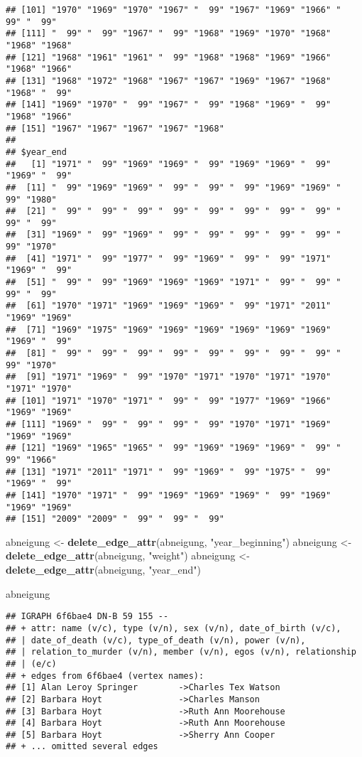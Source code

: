 \documentclass[
]{article}
\newenvironment{Shaded}{\begin{snugshade}}{\end{snugshade}}
\newcommand{\KeywordTok}[1]{\textcolor[rgb]{0.13,0.29,0.53}{\textbf{#1}}}
\newcommand{\NormalTok}[1]{#1}
\newcommand{\StringTok}[1]{\textcolor[rgb]{0.31,0.60,0.02}{#1}}
\begin{document}
\begin{verbatim}
## [101] "1970" "1969" "1970" "1967" "  99" "1967" "1969" "1966" "  99" "  99"
## [111] "  99" "  99" "1967" "  99" "1968" "1969" "1970" "1968" "1968" "1968"
## [121] "1968" "1961" "1961" "  99" "1968" "1968" "1969" "1966" "1968" "1966"
## [131] "1968" "1972" "1968" "1967" "1967" "1969" "1967" "1968" "1968" "  99"
## [141] "1969" "1970" "  99" "1967" "  99" "1968" "1969" "  99" "1968" "1966"
## [151] "1967" "1967" "1967" "1967" "1968"
## 
## $year_end
##   [1] "1971" "  99" "1969" "1969" "  99" "1969" "1969" "  99" "1969" "  99"
##  [11] "  99" "1969" "1969" "  99" "  99" "  99" "1969" "1969" "  99" "1980"
##  [21] "  99" "  99" "  99" "  99" "  99" "  99" "  99" "  99" "  99" "  99"
##  [31] "1969" "  99" "1969" "  99" "  99" "  99" "  99" "  99" "  99" "1970"
##  [41] "1971" "  99" "1977" "  99" "1969" "  99" "  99" "1971" "1969" "  99"
##  [51] "  99" "  99" "1969" "1969" "1969" "1971" "  99" "  99" "  99" "  99"
##  [61] "1970" "1971" "1969" "1969" "1969" "  99" "1971" "2011" "1969" "1969"
##  [71] "1969" "1975" "1969" "1969" "1969" "1969" "1969" "1969" "1969" "  99"
##  [81] "  99" "  99" "  99" "  99" "  99" "  99" "  99" "  99" "  99" "1970"
##  [91] "1971" "1969" "  99" "1970" "1971" "1970" "1971" "1970" "1971" "1970"
## [101] "1971" "1970" "1971" "  99" "  99" "1977" "1969" "1966" "1969" "1969"
## [111] "1969" "  99" "  99" "  99" "  99" "1970" "1971" "1969" "1969" "1969"
## [121] "1969" "1965" "1965" "  99" "1969" "1969" "1969" "  99" "  99" "1966"
## [131] "1971" "2011" "1971" "  99" "1969" "  99" "1975" "  99" "1969" "  99"
## [141] "1970" "1971" "  99" "1969" "1969" "1969" "  99" "1969" "1969" "1969"
## [151] "2009" "2009" "  99" "  99" "  99"
\end{verbatim}

\begin{Shaded}
\begin{Highlighting}[]
\NormalTok{abneigung <-}\StringTok{ }\KeywordTok{delete_edge_attr}\NormalTok{(abneigung, }\StringTok{"year_beginning"}\NormalTok{)}
\NormalTok{abneigung <-}\StringTok{ }\KeywordTok{delete_edge_attr}\NormalTok{(abneigung, }\StringTok{"weight"}\NormalTok{)}
\NormalTok{abneigung <-}\StringTok{ }\KeywordTok{delete_edge_attr}\NormalTok{(abneigung, }\StringTok{"year_end"}\NormalTok{)}

\NormalTok{abneigung}
\end{Highlighting}
\end{Shaded}

\begin{verbatim}
## IGRAPH 6f6bae4 DN-B 59 155 -- 
## + attr: name (v/c), type (v/n), sex (v/n), date_of_birth (v/c),
## | date_of_death (v/c), type_of_death (v/n), power (v/n),
## | relation_to_murder (v/n), member (v/n), egos (v/n), relationship
## | (e/c)
## + edges from 6f6bae4 (vertex names):
## [1] Alan Leroy Springer        ->Charles Tex Watson 
## [2] Barbara Hoyt               ->Charles Manson     
## [3] Barbara Hoyt               ->Ruth Ann Moorehouse
## [4] Barbara Hoyt               ->Ruth Ann Moorehouse
## [5] Barbara Hoyt               ->Sherry Ann Cooper  
## + ... omitted several edges
\end{verbatim}
\end{document}
